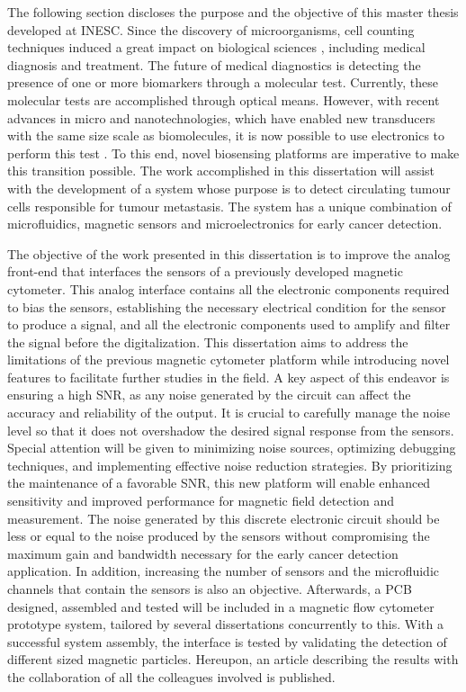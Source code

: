 The following section discloses the purpose and the objective of this master thesis developed at \ac{INESC}. Since the discovery of microorganisms, cell counting techniques induced a great impact on biological sciences \cite{JoseC_thesis}, including medical diagnosis and treatment. The future of medical diagnostics is detecting the presence of one or more biomarkers through a molecular test. Currently, these molecular tests are accomplished through optical means. However, with recent advances in micro and nanotechnologies, which have enabled new transducers with the same size scale as biomolecules, it is now possible to use electronics to perform this test \cite{PMID24761029}. To this end, novel biosensing platforms are imperative to make this transition possible. The work accomplished in this dissertation will assist with the development of a system whose purpose is to detect circulating tumour cells responsible for tumour metastasis. The system has a unique combination of microfluidics, magnetic sensors and microelectronics for early cancer detection.

The objective of the work presented in this dissertation is to improve the analog front-end that interfaces the sensors of a previously developed magnetic cytometer. This analog interface contains all the electronic components required to bias the sensors, establishing the necessary electrical condition for the sensor to produce a signal, and all the electronic components used to amplify and filter the signal before the digitalization. This dissertation aims to address the limitations of the previous magnetic cytometer platform while introducing novel features to facilitate further studies in the field. A key aspect of this endeavor is ensuring a high \ac{SNR}, as any noise generated by the circuit can affect the accuracy and reliability of the output. It is crucial to carefully manage the noise level so that it does not overshadow the desired signal response from the sensors. Special attention will be given to minimizing noise sources, optimizing debugging techniques, and implementing effective noise reduction strategies. By prioritizing the maintenance of a favorable \ac{SNR}, this new platform will enable enhanced sensitivity and improved performance for magnetic field detection and measurement. The noise generated by this discrete electronic circuit should be less or equal to the noise produced by the sensors without compromising the maximum gain and bandwidth necessary for the early cancer detection application. In addition, increasing the number of sensors and the microfluidic channels that contain the sensors is also an objective. Afterwards, a \ac{PCB} designed, assembled and tested will be included in a magnetic flow cytometer prototype system, tailored by several dissertations concurrently to this. With a successful system assembly, the interface is tested by validating the detection of different sized magnetic particles. Hereupon, an article describing the results with the collaboration of all the colleagues involved is published.

